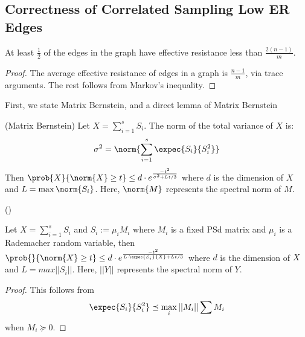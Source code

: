    



\subsection{Correctness of Correlated Sampling Low ER Edges}
\label{subsec:Sparsify}

\begin{lemma} \label{lem:edge-keeps}
At least $\frac{1}{2}$ of the edges in the graph have effective resistance less than $\frac{2(n-1)}{m}$. \end{lemma}

\begin{proof} The average effective resistance of edges in a graph is $\frac{n-1}{m}$, via trace arguments. The rest follows from Markov's inequality. \end{proof}

  First, we state Matrix Bernstein, and a direct lemma of Matrix Bernstein  
  \begin{theorem} (Matrix Bernstein)
    Let $X = \sum_{i=1}^s S_i$. The norm of the total variance of $X$ is:
    \begin{align}
      \sigma^2 = \norm{\sum_{i=1}^s \expec{S_i} {S_i^2}}
    \end{align}
    Then $\prob{X}{\norm{X} \geq t} \leq d \cdot e^{\frac{-t^2}{\sigma^2 + Lt/3}}$
    where $d$ is the dimension of $X$ and $L = \max \norm{S_i}$. Here,
    $\norm{M}$ represents the spectral norm of $M$. 

    ()
  \end{theorem}
  \begin{lemma} \label{lem:matrix-azuma}
    Let $X = \sum_{i=1}^s S_i$ and $S_i := \mu_i M_i$ where $M_i$ is a fixed PSd matrix and
    $\mu_i$ is a Rademacher random variable, 
    then $\prob{}{\norm{X} \geq t} \leq d \cdot e^{\frac{-t^2}{L \cdot \expec{S_i}{X}+ Lt/3}}$
    where $d$ is the dimension of $X$ and $L = max||S_i||$.
    Here, $||Y ||$ represents the spectral norm of $Y$.
  \end{lemma}
  \begin{proof} This follows from
    \begin{align}
    \expec{S_i}{S_i^2} \preceq \max_{i}||M_i|| \sum{M_i} 
    \end{align}
    when $M_i \succeq 0$.

  \end{proof}

